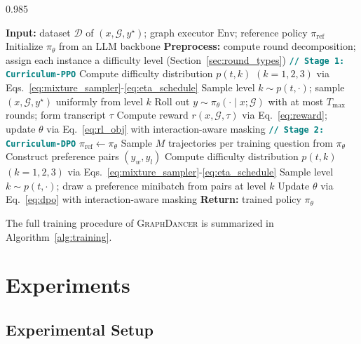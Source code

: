 \documentclass[11pt]{article}
\newcommand{\ours}{\textsc{GraphDancer}\xspace}
\begin{document}
\begin{spacing}{0.985}
\begin{algorithm}[t]
\small
\caption{\ours: two-stage training}
\label{alg:training}
\begin{algorithmic}[1]
\STATE \textbf{Input:} dataset $\mathcal{D}$ of $(x,\mathcal{G},y^\star)$; graph executor $\mathrm{Env}$; reference policy $\pi_{\mathrm{ref}}$
\STATE Initialize $\pi_{\theta}$ from an LLM backbone
\STATE \textbf{Preprocess:} compute round decomposition; assign each instance a difficulty level (Section~\ref{sec:round_types})
\STATE \textbf{\texttt{\textcolor{teal}{// Stage 1: Curriculum-PPO}}}
    \STATE Compute difficulty distribution $p(t,k)$ $(k=1,2,3)$ via Eqs.~\ref{eq:mixture_sampler}-\ref{eq:eta_schedule}
    \STATE Sample level $k \sim p(t,\cdot)$; sample $(x,\mathcal{G},y^\star)$ uniformly from level $k$
    \STATE Roll out $y \sim \pi_{\theta}(\cdot \mid x; \mathcal{G})$ with at most $T_{\max}$ rounds; form transcript $\tau$
    \STATE Compute reward $r(x,\mathcal{G},\tau)$ via Eq.~\ref{eq:reward}; update $\theta$ via Eq.~\ref{eq:rl_obj} with interaction-aware masking
\ENDFOR
\STATE \textbf{\texttt{\textcolor{teal}{// Stage 2: Curriculum-DPO}}}
\STATE $\pi_{\mathrm{ref}} \leftarrow \pi_{\theta}$
\STATE Sample $M$ trajectories per training question from $\pi_{\theta}$
\STATE Construct preference pairs $(y_w, y_l)$
    \STATE Compute difficulty distribution $p(t,k)$ $(k=1,2,3)$ via Eqs.~\ref{eq:mixture_sampler}-\ref{eq:eta_schedule}
    \STATE Sample level $k \sim p(t,\cdot)$; draw a preference minibatch from pairs at level $k$
    \STATE Update $\theta$ via Eq.~\ref{eq:dpo} with interaction-aware masking
\ENDFOR
\STATE \textbf{Return:} trained policy $\pi_{\theta}$
\end{algorithmic}
\end{algorithm}

The full training procedure of \ours is summarized in Algorithm~\ref{alg:training}.

\section{Experiments}
\label{sec:exp}

\subsection{Experimental Setup}
\label{sec:exp_setup}


\end{spacing}
\end{document}
